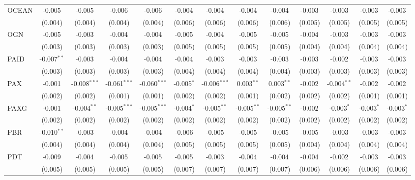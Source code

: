 \begin{table}[!htbp]
\begin{tabular}{@{\extracolsep{5pt}}lcccccccccccc}
 OCEAN & -0.005$^{}$ & -0.005$^{}$ & -0.006$^{}$ & -0.006$^{}$ & -0.004$^{}$ & -0.004$^{}$ & -0.004$^{}$ & -0.004$^{}$ & -0.003$^{}$ & -0.003$^{}$ & -0.003$^{}$ & -0.003$^{}$ \\
  & (0.004) & (0.004) & (0.004) & (0.004) & (0.006) & (0.006) & (0.006) & (0.006) & (0.005) & (0.005) & (0.005) & (0.005) \\
 OGN & -0.005$^{}$ & -0.003$^{}$ & -0.004$^{}$ & -0.004$^{}$ & -0.005$^{}$ & -0.004$^{}$ & -0.005$^{}$ & -0.005$^{}$ & -0.004$^{}$ & -0.003$^{}$ & -0.003$^{}$ & -0.003$^{}$ \\
  & (0.003) & (0.003) & (0.003) & (0.003) & (0.005) & (0.005) & (0.005) & (0.005) & (0.004) & (0.004) & (0.004) & (0.004) \\
 PAID & -0.007$^{**}$ & -0.003$^{}$ & -0.004$^{}$ & -0.004$^{}$ & -0.004$^{}$ & -0.003$^{}$ & -0.003$^{}$ & -0.003$^{}$ & -0.003$^{}$ & -0.002$^{}$ & -0.003$^{}$ & -0.003$^{}$ \\
  & (0.003) & (0.003) & (0.003) & (0.003) & (0.004) & (0.004) & (0.004) & (0.004) & (0.003) & (0.003) & (0.003) & (0.003) \\
 PAX & -0.001$^{}$ & -0.008$^{***}$ & -0.061$^{***}$ & -0.060$^{***}$ & -0.005$^{*}$ & -0.006$^{***}$ & 0.003$^{**}$ & 0.003$^{**}$ & -0.002$^{}$ & -0.004$^{**}$ & -0.002$^{}$ & -0.002$^{}$ \\
  & (0.002) & (0.002) & (0.001) & (0.001) & (0.002) & (0.002) & (0.001) & (0.002) & (0.002) & (0.002) & (0.001) & (0.001) \\
 PAXG & -0.001$^{}$ & -0.004$^{**}$ & -0.005$^{***}$ & -0.005$^{***}$ & -0.004$^{*}$ & -0.005$^{**}$ & -0.005$^{**}$ & -0.005$^{**}$ & -0.002$^{}$ & -0.003$^{*}$ & -0.003$^{*}$ & -0.003$^{*}$ \\
  & (0.002) & (0.002) & (0.002) & (0.002) & (0.002) & (0.002) & (0.002) & (0.002) & (0.002) & (0.002) & (0.002) & (0.002) \\
 PBR & -0.010$^{**}$ & -0.003$^{}$ & -0.004$^{}$ & -0.004$^{}$ & -0.006$^{}$ & -0.005$^{}$ & -0.005$^{}$ & -0.005$^{}$ & -0.005$^{}$ & -0.003$^{}$ & -0.003$^{}$ & -0.003$^{}$ \\
  & (0.004) & (0.004) & (0.004) & (0.004) & (0.005) & (0.005) & (0.005) & (0.005) & (0.004) & (0.004) & (0.004) & (0.004) \\
 PDT & -0.009$^{}$ & -0.004$^{}$ & -0.005$^{}$ & -0.005$^{}$ & -0.005$^{}$ & -0.003$^{}$ & -0.004$^{}$ & -0.004$^{}$ & -0.004$^{}$ & -0.002$^{}$ & -0.003$^{}$ & -0.003$^{}$ \\
  & (0.005) & (0.005) & (0.005) & (0.005) & (0.007) & (0.007) & (0.007) & (0.007) & (0.006) & (0.006) & (0.006) & (0.006) \\

\end{tabular}
\end{table}
